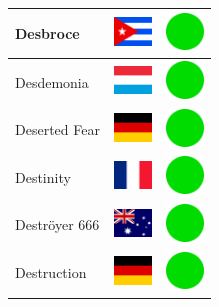 \documentclass[12pt, a4paper, twoside]{report}
\begin{document}
\begin{center}
\begin{longtable}{|p{5cm}|p{2cm}|p{2cm}|}
 Desbroce                                                   & \includegraphics[width=1cm]{../4x3/cu} &   \includegraphics[width=1cm]{../likes/y} \\ \hline
 Desdemonia                                                 & \includegraphics[width=1cm]{../4x3/lu} &   \includegraphics[width=1cm]{../likes/y} \\ \hline
 Deserted Fear                                              & \includegraphics[width=1cm]{../4x3/de} &   \includegraphics[width=1cm]{../likes/y} \\ \hline
 Destinity                                                  & \includegraphics[width=1cm]{../4x3/fr} &   \includegraphics[width=1cm]{../likes/y} \\ \hline
 Deströyer 666                                              & \includegraphics[width=1cm]{../4x3/au} &   \includegraphics[width=1cm]{../likes/y} \\ \hline
 Destruction                                                & \includegraphics[width=1cm]{../4x3/de} &   \includegraphics[width=1cm]{../likes/y} \\ \hline

\end{longtable}
\end{center}
\end{document}
